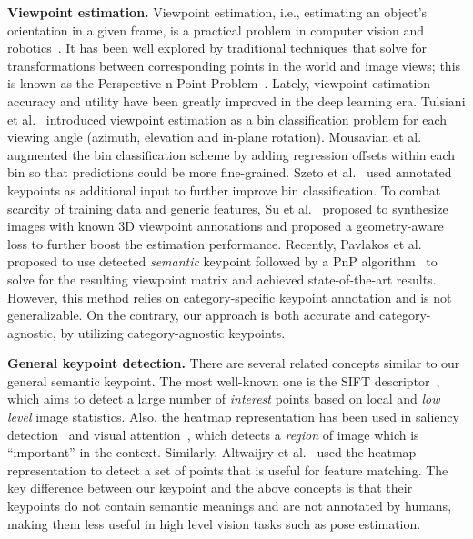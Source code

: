\documentclass[runningheads]{llncs}
\begin{document}
\textbf{Viewpoint estimation.}
Viewpoint estimation, i.e., estimating an object's orientation in a given frame, is a practical problem in computer vision and robotics~\cite{kendall2015posenet,pavlakos20176}.
It has been well explored by traditional techniques that solve for transformations between corresponding points in the world and image views; this is known as the Perspective-n-Point  Problem~\cite{lepetit2009epnp,lu2000fast}.
Lately, viewpoint estimation accuracy and utility have been greatly improved in the deep learning era.
Tulsiani et al.~\cite{tulsiani2015viewpoints} introduced viewpoint estimation as a bin classification problem for each viewing angle (azimuth, elevation and in-plane rotation). 
Mousavian et al.~\cite{mousavian20173d} augmented the bin classification scheme by adding regression offsets within each bin so that predictions could be more fine-grained. 
Szeto et al.~\cite{szeto2017click} used annotated keypoints as additional input to further improve bin classification.
To combat scarcity of training data and generic features, Su et al.~\cite{su2015render} proposed to synthesize images with known 3D viewpoint annotations and proposed a geometry-aware loss to further boost the estimation performance.
Recently, Pavlakos et al.~\cite{pavlakos20176} proposed to use detected \emph{semantic} keypoint followed by a PnP algorithm~\cite{lepetit2009epnp} to solve for the resulting viewpoint matrix and achieved state-of-the-art results. 
However, this method relies on category-specific keypoint annotation and is not generalizable. 
On the contrary, our approach is both accurate and category-agnostic, by utilizing category-agnostic keypoints. 

\textbf{General keypoint detection.}
There are several related concepts similar to our general semantic keypoint. 
The most well-known one is the SIFT descriptor~\cite{lowe2004distinctive}, which aims to detect a large 
number of \emph{interest} points based on local and \emph{low level} image statistics. 
Also, the heatmap representation has been used in saliency detection~\cite{huang2015salicon} and visual attention~\cite{xu2015show}, which detects a \emph{region} of image
which is ``important'' in the context.
Similarly, Altwaijry et al.~\cite{altwaijry2016learning} used the heatmap representation to detect a set of points that is useful for feature matching. 
The key difference between our keypoint and the above concepts is that their keypoints do not contain semantic meanings and are not annotated by humans, making them less useful in high level vision tasks such as pose estimation.  
\end{document}

